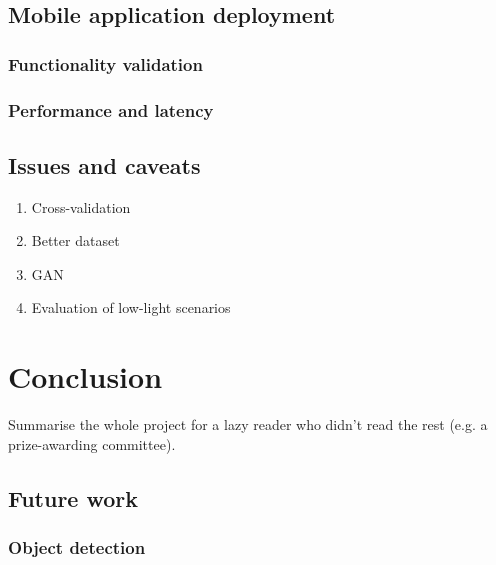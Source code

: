 \documentclass{l4proj}
\begin{document}

\section{Mobile application deployment}

\subsection{Functionality validation}

\subsection{Performance and latency}


\section{Issues and caveats}

\begin{enumerate}
  \item Cross-validation
  \item Better dataset
  \item GAN
  \item Evaluation of low-light scenarios
\end{enumerate}

\chapter{Conclusion}    
Summarise the whole project for a lazy reader who didn't read the rest (e.g. a prize-awarding committee).


\section{Future work}

\subsection{Object detection}
\end{document}

